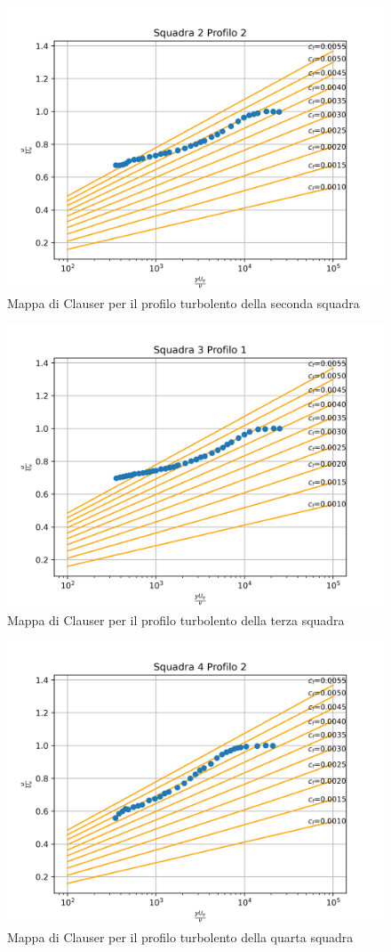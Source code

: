 \begin{figure}[H]
    \centering
    \includegraphics[width=.8\textwidth]{images/9/sq2p2clauser.png}
    \caption{Mappa di Clauser per il profilo turbolento della seconda squadra}
\end{figure}

\begin{figure}[H]
    \centering
    \includegraphics[width=.8\textwidth]{images/9/sq3p1clauser.png}
    \caption{Mappa di Clauser per il profilo turbolento della terza squadra}
\end{figure}

\begin{figure}[H]
    \centering
    \includegraphics[width=.8\textwidth]{images/9/sq4p2clauser.png}
    \caption{Mappa di Clauser per il profilo turbolento della quarta squadra}
\end{figure}

